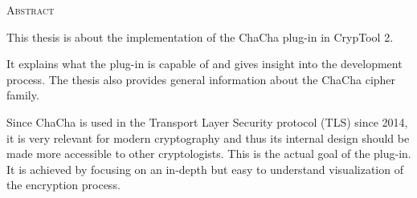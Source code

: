
\begin{center}
  \textsc{Abstract}
\end{center}

\noindent
This thesis is about the implementation of the ChaCha plug-in in CrypTool 2.

\medskip
\noindent
It explains what the plug-in is capable of and gives insight into the development process. The thesis also provides general information about the ChaCha cipher family.

\medskip
\noindent
Since ChaCha is used in the Transport Layer Security protocol (TLS) since 2014, it is very relevant for modern cryptography and thus its internal design should be made more accessible to other cryptologists. This is the actual goal of the plug-in. It is achieved by focusing on an in-depth but easy to understand visualization of the encryption process.

